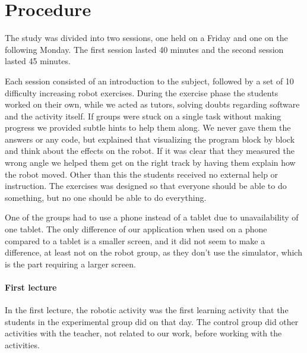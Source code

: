 \section{Procedure}
The study was divided into two sessions, one held on a Friday and one on the following Monday. The first session lasted 40 minutes and the second session lasted 45 minutes. 


Each session consisted of an introduction to the subject, followed by a set of 10 difficulty increasing robot exercises. 
During the exercise phase the students worked on their own, while we acted as tutors, solving doubts regarding software and the activity itself. If groups were stuck on a single task without making progress we provided subtle hints to help them along. 
We never gave them the answers or any code, but explained that visualizing the program block by block and think about the effects on the robot. If it was clear that they measured the wrong angle we helped them get on the right track by having them explain how the robot moved. 
Other than this the students received no external help or instruction. The exercises was designed so that everyone should be able to do something, but no one should be able to do everything. 

One of the groups had to use a phone instead of a tablet due to unavailability of one tablet. 
The only difference of our application when used on a phone compared to a tablet is a smaller screen, and it did not seem to make a difference, at least not on the robot group, as they don't use the simulator, which is the part requiring a larger screen. 

\paragraph{First lecture}
In the first lecture, the robotic activity was the first learning activity that the students in the experimental group did on that day. 
The control group did other activities with the teacher, not related to our work, before working with the activities. 

